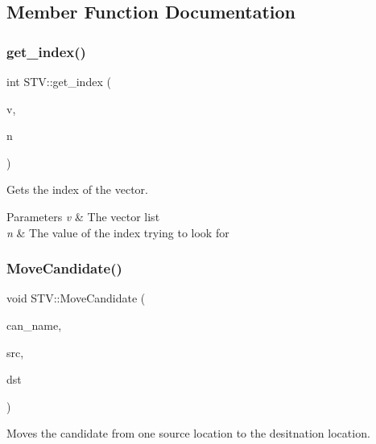 \subsection{Member Function Documentation}
\mbox{\label{class_s_t_v_a28fcd1b404443f9fb1562a4343a44fb9}} 
\subsubsection{\texorpdfstring{get\+\_\+index()}{get\_index()}}
{\footnotesize\ttfamily int S\+T\+V\+::get\+\_\+index (\begin{DoxyParamCaption}\item[{vector$<$ int $>$}]{v,  }\item[{int}]{n }\end{DoxyParamCaption})}



Gets the index of the vector. 


\begin{DoxyParams}{Parameters}
{\em v} & The vector list \\
\hline
{\em n} & The value of the index trying to look for \\
\hline
\end{DoxyParams}
\mbox{\label{class_s_t_v_ae905b9379a145c034f40428618668d57}} 
\subsubsection{\texorpdfstring{Move\+Candidate()}{MoveCandidate()}}
{\footnotesize\ttfamily void S\+T\+V\+::\+Move\+Candidate (\begin{DoxyParamCaption}\item[{string}]{can\+\_\+name,  }\item[{\mbox{\hyperlink{class_candidate_list}{Candidate\+List}} \&}]{src,  }\item[{\mbox{\hyperlink{class_candidate_list}{Candidate\+List}} \&}]{dst }\end{DoxyParamCaption})}



Moves the candidate from one source location to the desitnation location. 


